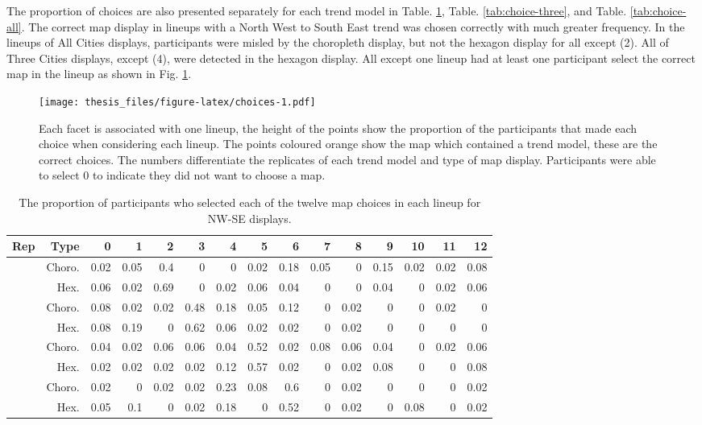 \documentclass{monashthesis}
\begin{document}
The proportion of choices are also presented separately for each trend model in Table. \ref{tab:choice-nwse}, Table. \ref{tab:choice-three}, and Table. \ref{tab:choice-all}.
The correct map display in lineups with a North West to South East trend was chosen correctly with much greater frequency.
In the lineups of All Cities displays, participants were misled by the choropleth display, but not the hexagon display for all except (2).
All of Three Cities displays, except (4), were detected in the hexagon display. All except one lineup had at least one participant select the correct map in the lineup as shown in Fig. \ref{fig:choices}.

\begin{figure}
\centering
\texttt{[image: thesis\_files/figure-latex/choices-1.pdf]}
\caption{\label{fig:choices}Each facet is associated with one lineup, the height of the points show the proportion of the participants that made each choice when considering each lineup. The points coloured orange show the map which contained a trend model, these are the correct choices. The numbers differentiate the replicates of each trend model and type of map display. Participants were able to select 0 to indicate they did not want to choose a map.}
\end{figure}

\begin{table}

\caption{\label{tab:choice-nwse}The proportion of participants who selected each of the twelve map choices in each lineup for NW-SE displays.}
\centering
\begin{tabular}[t]{r|r|r|r|r|r|r|r|r|r|r|r|r|r|r}
\hline
Rep & Type & 0 & 1 & 2 & 3 & 4 & 5 & 6 & 7 & 8 & 9 & 10 & 11 & 12\\
\hline
 & Choro. & 0.02 & 0.05 & 0.4 & 0 & 0 & 0.02 & 0.18 & 0.05 & 0 & 0.15 & 0.02 & 0.02 & 0.08\\
\cline{2-15}
\multirow{-2}{*}{\raggedleft\arraybackslash 1} & Hex. & 0.06 & 0.02 & 0.69 & 0 & 0.02 & 0.06 & 0.04 & 0 & 0 & 0.04 & 0 & 0.02 & 0.06\\
\cline{1-15}
 & Choro. & 0.08 & 0.02 & 0.02 & 0.48 & 0.18 & 0.05 & 0.12 & 0 & 0.02 & 0 & 0 & 0.02 & 0\\
\cline{2-15}
\multirow{-2}{*}{\raggedleft\arraybackslash 2} & Hex. & 0.08 & 0.19 & 0 & 0.62 & 0.06 & 0.02 & 0.02 & 0 & 0.02 & 0 & 0 & 0 & 0\\
\cline{1-15}
 & Choro. & 0.04 & 0.02 & 0.06 & 0.06 & 0.04 & 0.52 & 0.02 & 0.08 & 0.06 & 0.04 & 0 & 0.02 & 0.06\\
\cline{2-15}
\multirow{-2}{*}{\raggedleft\arraybackslash 3} & Hex. & 0.02 & 0.02 & 0.02 & 0.02 & 0.12 & 0.57 & 0.02 & 0 & 0.02 & 0.08 & 0 & 0 & 0.08\\
\cline{1-15}
 & Choro. & 0.02 & 0 & 0.02 & 0.02 & 0.23 & 0.08 & 0.6 & 0 & 0.02 & 0 & 0 & 0 & 0.02\\
\cline{2-15}
\multirow{-2}{*}{\raggedleft\arraybackslash 4} & Hex. & 0.05 & 0.1 & 0 & 0.02 & 0.18 & 0 & 0.52 & 0 & 0.02 & 0 & 0.08 & 0 & 0.02\\
\hline
\end{tabular}
\end{table}
\end{document}

